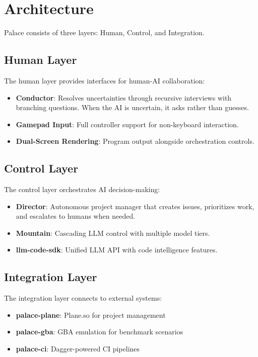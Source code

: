 \documentclass[11pt,a4paper]{article}
\begin{document}
\section{Architecture}

Palace consists of three layers: Human, Control, and Integration.

\subsection{Human Layer}

The human layer provides interfaces for human-AI collaboration:

\begin{itemize}
    \item \textbf{Conductor}: Resolves uncertainties through recursive interviews with
          branching questions. When the AI is uncertain, it asks rather than guesses.
    \item \textbf{Gamepad Input}: Full controller support for non-keyboard interaction.
    \item \textbf{Dual-Screen Rendering}: Program output alongside orchestration controls.
\end{itemize}

\subsection{Control Layer}

The control layer orchestrates AI decision-making:

\begin{itemize}
    \item \textbf{Director}: Autonomous project manager that creates issues,
          prioritizes work, and escalates to humans when needed.
    \item \textbf{Mountain}: Cascading LLM control with multiple model tiers.
    \item \textbf{llm-code-sdk}: Unified LLM API with code intelligence features.
\end{itemize}

\subsection{Integration Layer}

The integration layer connects to external systems:

\begin{itemize}
    \item \textbf{palace-plane}: Plane.so for project management
    \item \textbf{palace-gba}: GBA emulation for benchmark scenarios
    \item \textbf{palace-ci}: Dagger-powered CI pipelines
\end{itemize}
\end{document}

